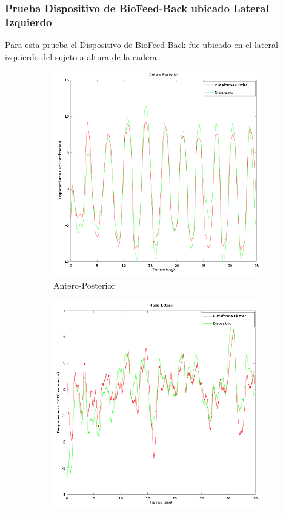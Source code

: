 \documentclass[12pt,a4paper]{article}
\newcommand{\nombreDispositivo}{Dispositivo de BioFeed-Back }
\begin{document}
\newpage
\subsubsection{Prueba \nombreDispositivo ubicado Lateral Izquierdo}
	Para esta prueba el \nombreDispositivo fue ubicado en el lateral izquierdo del sujeto a altura de la cadera.
		
	\begin{figure}[H]
		\centering
		\begin{subfigure}{.5\textwidth}
			\centering
			\includegraphics[width=1\linewidth]{images/pruebas/LateralIzquierdo/Antero-Posterior}
			\caption{Antero-Posterior}
			\label{fig:anteroPosteriorLateral}
		\end{subfigure}%
		\begin{subfigure}{.5\textwidth}
			\centering
			\includegraphics[width=1\linewidth]{images/pruebas/LateralIzquierdo/Medio-Lateral}

\end{subfigure}
\end{figure}
\end{document}
